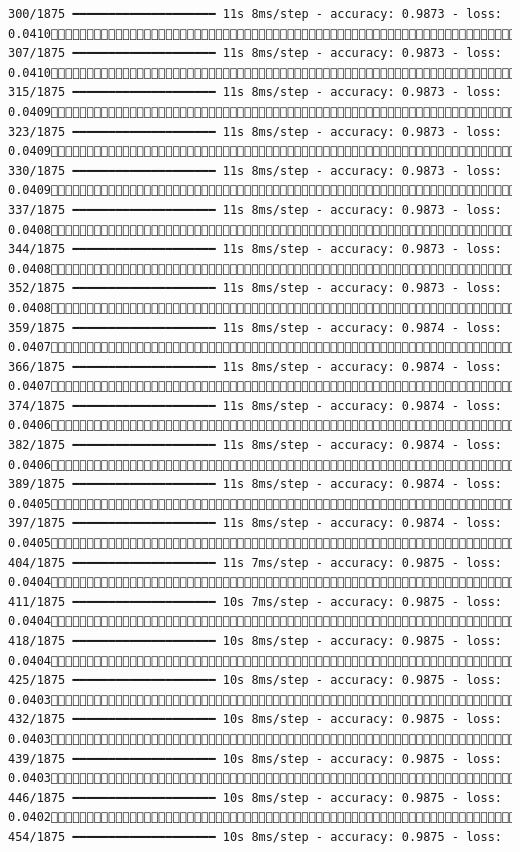 \documentclass[
  letterpaper,
  DIV=11,
  numbers=noendperiod]{scrreprt}
\begin{document}
\begin{verbatim}
300/1875 ━━━━━━━━━━━━━━━━━━━━ 11s 8ms/step - accuracy: 0.9873 - loss: 0.0410 307/1875 ━━━━━━━━━━━━━━━━━━━━ 11s 8ms/step - accuracy: 0.9873 - loss: 0.0410 315/1875 ━━━━━━━━━━━━━━━━━━━━ 11s 8ms/step - accuracy: 0.9873 - loss: 0.0409 323/1875 ━━━━━━━━━━━━━━━━━━━━ 11s 8ms/step - accuracy: 0.9873 - loss: 0.0409 330/1875 ━━━━━━━━━━━━━━━━━━━━ 11s 8ms/step - accuracy: 0.9873 - loss: 0.0409 337/1875 ━━━━━━━━━━━━━━━━━━━━ 11s 8ms/step - accuracy: 0.9873 - loss: 0.0408 344/1875 ━━━━━━━━━━━━━━━━━━━━ 11s 8ms/step - accuracy: 0.9873 - loss: 0.0408 352/1875 ━━━━━━━━━━━━━━━━━━━━ 11s 8ms/step - accuracy: 0.9873 - loss: 0.0408 359/1875 ━━━━━━━━━━━━━━━━━━━━ 11s 8ms/step - accuracy: 0.9874 - loss: 0.0407 366/1875 ━━━━━━━━━━━━━━━━━━━━ 11s 8ms/step - accuracy: 0.9874 - loss: 0.0407 374/1875 ━━━━━━━━━━━━━━━━━━━━ 11s 8ms/step - accuracy: 0.9874 - loss: 0.0406 382/1875 ━━━━━━━━━━━━━━━━━━━━ 11s 8ms/step - accuracy: 0.9874 - loss: 0.0406 389/1875 ━━━━━━━━━━━━━━━━━━━━ 11s 8ms/step - accuracy: 0.9874 - loss: 0.0405 397/1875 ━━━━━━━━━━━━━━━━━━━━ 11s 8ms/step - accuracy: 0.9874 - loss: 0.0405 404/1875 ━━━━━━━━━━━━━━━━━━━━ 11s 7ms/step - accuracy: 0.9875 - loss: 0.0404 411/1875 ━━━━━━━━━━━━━━━━━━━━ 10s 7ms/step - accuracy: 0.9875 - loss: 0.0404 418/1875 ━━━━━━━━━━━━━━━━━━━━ 10s 8ms/step - accuracy: 0.9875 - loss: 0.0404 425/1875 ━━━━━━━━━━━━━━━━━━━━ 10s 8ms/step - accuracy: 0.9875 - loss: 0.0403 432/1875 ━━━━━━━━━━━━━━━━━━━━ 10s 8ms/step - accuracy: 0.9875 - loss: 0.0403 439/1875 ━━━━━━━━━━━━━━━━━━━━ 10s 8ms/step - accuracy: 0.9875 - loss: 0.0403 446/1875 ━━━━━━━━━━━━━━━━━━━━ 10s 8ms/step - accuracy: 0.9875 - loss: 0.0402 454/1875 ━━━━━━━━━━━━━━━━━━━━ 10s 8ms/step - accuracy: 0.9875 - loss: 
\end{verbatim}
\end{document}
